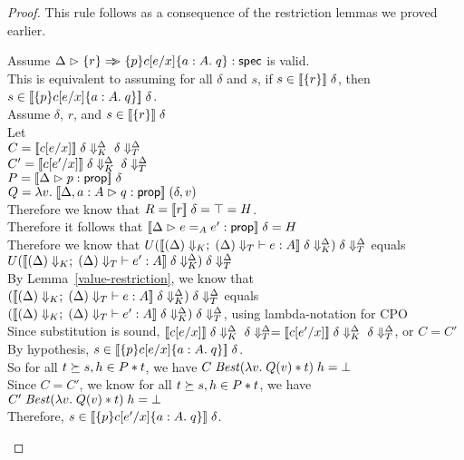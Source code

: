 \begin{proof}
This rule follows as a consequence of the restriction lemmas we proved earlier. 

\begin{tabbedproof}
\oo Assume $\judgeS{\setof{r} \specimp \spec{p}{c[e/x]}{a:A}{q}}$ is valid. \\
\ooo This is equivalent to assuming for all $\delta$ and $s$, if $s \in \interp{\setof{r}}\;\delta$, then $s \in \interp{\spec{p}{c[e/x]}{a:A}{q}}\;\delta$. \\
\ooo Assume $\delta$, $r$, and $s \in \interp{\setof{r}}\;\delta$ \\
\oooo Let \\
\oooox $C = \interp{c[e/x]}\;\restricttyenv{\Delta}{\delta}\;\restrictvals{\Delta}{\delta}$ \\
\oooox $C' = \interp{c[e'/x]}\;\restricttyenv{\Delta}{\delta}\;\restrictvals{\Delta}{\delta}$ \\
\oooox $P = \interp{\judgeA{p}{\assert}}\;\delta$ \\
\oooox $Q = \semfun{v}{\interp{\judgeA[\Delta,a:A]{q}{\assert}}\;(\delta,v)}$ \\
\oooo Therefore we know that $R = \interp{r}\;\delta = \top = H$. \\
\oooo Therefore it follows that $\interp{\judgeA{e =_A e'}{\assert}}\;\delta = H$ \\
\oooo Therefore we know that $U(\interp{\judgeE[\restrictkind{\Delta}]{\restricttype{\Delta}}{e}{A}}\;\restricttyenv{\Delta}{\delta})\;\restrictvals{\Delta}{\delta}$ equals \\
\ooox $U(\interp{\judgeE[\restrictkind{\Delta}]{\restricttype{\Delta}}{e'}{A}}\;\restricttyenv{\Delta}{\delta})\;\restrictvals{\Delta}{\delta}$ \\
\oooo By Lemma~\ref{value-restriction}, we know that 
$(\interp{\judgeE[\restrictkind{\Delta}]{\restricttype{\Delta}}{e}{A}}\;\restricttyenv{\Delta}{\delta})\;\restrictvals{\Delta}{\delta}$ equals \\
\ooox $(\interp{\judgeE[\restrictkind{\Delta}]{\restricttype{\Delta}}{e'}{A}}\;\restricttyenv{\Delta}{\delta})\;\restrictvals{\Delta}{\delta}$, using lambda-notation for CPO \\
\oooo Since substitution is sound, $\interp{c[e/x]}\;\restricttyenv{\Delta}{\delta}\;\restrictvals{\Delta}{\delta}  = \interp{c[e'/x]}\;\restricttyenv{\Delta}{\delta}\;\restrictvals{\Delta}{\delta}$, or $C = C'$\\
\oooo By hypothesis, $s \in \interp{\spec{p}{c[e/x]}{a:A}{q}}\;\delta$. \\
\oooo So for all $t \worldgeq s, h \in P * t$, we have $C\;\mathit{Best}(\semfun{v}{Q(v) * t})\;h = \bot$ \\
\oooo Since $C = C'$, we know for all $t \worldgeq s, h \in P * t$, we have $C'\;\mathit{Best}(\semfun{v}{Q(v) * t})\;h = \bot$ \\
\oooo Therefore, $s \in \interp{\spec{p}{c[e'/x]}{a:A}{q}}\;\delta$. \\
\end{tabbedproof}
\end{proof}

